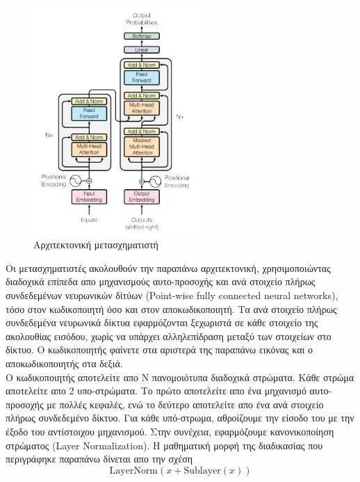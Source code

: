 \documentclass[12pt]{article}
\numberwithin{equation}{section}
\begin{document}
\begin{figure}[h!]
  \centering
  \includegraphics[width=0.6\textwidth]{images/Transformers.png} %
  \caption{Αρχιτεκτονική μετασχηματιστή}
  \label{figure 20}
\end{figure} 

Οι μετασχηματιστές ακολουθούν την παραπάνω αρχιτεκτονική, χρησιμοποιώντας διαδοχικά επίπεδα απο μηχανισμούς αυτο-προσοχής και  ανά στοιχείο πλήρως συνδεδεμένων νευρωνικών δίτύων (Point-wise fully connected neural networks), τόσο στον κωδικοποιητή όσο και στον αποκωδικοποιητή. Τα ανά στοιχείο πλήρως συνδεδεμένα νευρωνικά δίκτυα εφαρμόζονται ξεχωριστά σε κάθε στοιχείο της ακολουθίας εισόδου, χωρίς να υπάρχει αλληλεπίδραση μεταξύ των στοιχείων στο δίκτυο. Ο κωδικοποιητής φαίνετε στα αριστερά της παραπάνω εικόνας και ο αποκωδικοποιητής στα δεξιά. \\

Ο κωδικοποιητής αποτελείτε απο Ν πανομοιότυπα διαδοχικά στρώματα. Κάθε στρώμα αποτελείτε απο 2 υπο-στρώματα. Το πρώτο αποτελείτε απο ένα μηχανισμό αυτο-προσοχής με πολλές κεφαλές, ενώ το δεύτερο αποτελείτε απο ένα ανά στοιχείο πλήρως συνδεδεμένο δίκτυο. Για κάθε υπό-στρωμα, αθροίζουμε την είσοδο του με την έξοδο του αντίστοιχου μηχανισμού. Στην συνέχεια, εφαρμόζουμε κανονικοποίηση στρώματος (Layer Normalization). Η μαθηματική μορφή της διαδικασίας που περιγράφηκε παραπάνω δίνεται απο την σχέση  \\

\begin{equation}
\text{LayerNorm}(x + \text{Sublayer}(x))
\label{eq:ka}
\end{equation}\\
\end{document}
